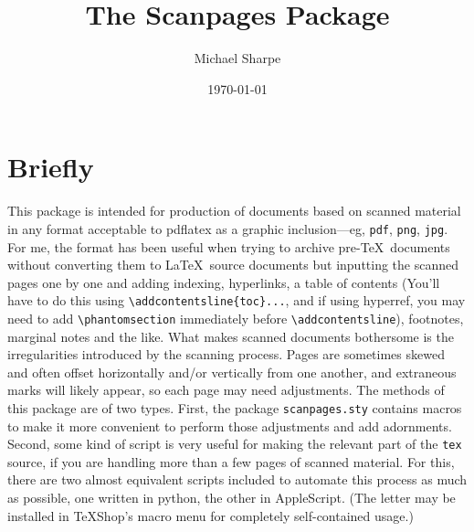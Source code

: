 \documentclass[11pt]{article}
\title{The \textsf{Scanpages} Package}
\author{Michael Sharpe}
\date{\today}  %
\begin{document}
\maketitle
\section{Briefly}
This package is intended for production of documents based on scanned material in any format acceptable to \textsf{pdflatex} as a graphic inclusion---eg, {\tt pdf}, {\tt png}, {\tt jpg}. For me, the format has been useful when trying to archive pre-\TeX\ documents without converting them to \LaTeX\ source documents but inputting the scanned pages one by one and adding indexing, hyperlinks, a table of contents (You'll have to do this using \verb|\addcontentsline{toc}...|, and if using \textsf{hyperref}, you may need to add \verb|\phantomsection| immediately before \verb|\addcontentsline|), footnotes, marginal notes and the like. What makes scanned documents bothersome is the irregularities introduced by the scanning process. Pages are sometimes skewed and often offset horizontally and/or  vertically from one another, and extraneous marks will likely appear, so each page may need adjustments. The methods of this package are of two types. First, the package {\tt scanpages.sty} contains macros to make it more convenient to perform those adjustments and add adornments. Second, some kind of script is very useful for making the relevant part of the {\tt tex} source, if you are handling more than a few pages of scanned material. For this, there are two almost equivalent scripts included to automate this process as much as possible, one written in \textsf{python}, the other in \textsf{AppleScript.} (The letter may be installed in \TeX Shop's macro menu for completely self-contained usage.)
\end{document}

